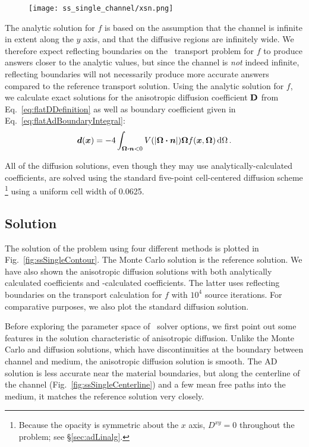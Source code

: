 \begin{figure}[htb]
  \centering
  \texttt{[image: ss\_single\_channel/xsn.png]}
  \label{fig:ssSingleXsn}
\end{figure}

The analytic solution for $f$ is based on the assumption that the channel is
infinite in extent along the $y$ axis, and that the diffusive regions are
infinitely wide. We therefore expect reflecting boundaries on the \SN\ transport
problem for $f$ to produce answers closer to the analytic values, but since the
channel is \emph{not} indeed infinite, reflecting boundaries will not
necessarily produce more accurate answers compared to the reference transport
solution. Using the analytic solution for $f$, we calculate exact solutions for
the anisotropic diffusion coefficient $\mathbf{D}$ from
Eq.~\eqref{eq:flatDDefinition}
as well as boundary coefficient given in Eq.~\eqref{eq:flatAdBoundaryIntegral}:
\begin{equation*}
  \bm{d}(\bm{x}) = -4\int_{\bm{\Omega}\bm{\cdot}\bm{n} < 0}
  V(\left| \bm{\Omega}\bm{\cdot}\bm{n} \right|)
\bm{\Omega} f(\bm{x}, \bm{\Omega}) \mathop{}\!\mathrm{d}\Omega\,.
\end{equation*}

All of the diffusion solutions, even though they may use analytically-calculated
coefficients, are solved using the standard five-point cell-centered diffusion
scheme%
\footnote{%
Because the opacity is symmetric about the $x$ axis, $D^{xy}=0$
throughout the problem; see \S\ref{sec:adLinalg}.
} using a uniform cell width of 0.0625.

\subsection{Solution}
The solution of the problem using four different methods is plotted in
Fig.~\ref{fig:ssSingleContour}. The Monte Carlo solution is the reference
solution.  We have also shown the anisotropic diffusion solutions with
both analytically calculated coefficients and \SN-calculated coefficients. The
latter uses reflecting boundaries on the transport calculation for $f$ with
$10^4$ source iterations. For comparative purposes, we also plot the standard
diffusion solution.

Before exploring the parameter space of \SN\ solver options, we first point out
some features in the solution characteristic of anisotropic diffusion. Unlike
the Monte Carlo and diffusion solutions, which have discontinuities at the
boundary between channel and medium, the anisotropic diffusion solution is
smooth. The AD solution is less accurate near the material boundaries, but along
the centerline of the channel (Fig.~\ref{fig:ssSingleCenterline}) and a few mean
free paths into the medium, it matches the reference solution very closely.

